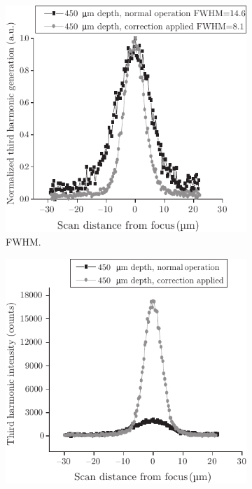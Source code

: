 \begin{figure}[tbh]
       \centering
        \begin{subfigure}[b]{0.45\textwidth}
                \includegraphics[width=\textwidth]{images/genetic_TPFM_FWHM}
                \caption{FWHM.}
                \label{fig:genetic_TPFM_FWHM}
        \end{subfigure}
				\hspace{1em}
        \begin{subfigure}[b]{0.45\textwidth}
                \includegraphics[width=\textwidth]{images/genetic_TPFM_intensity}

\end{subfigure}
\end{figure}
